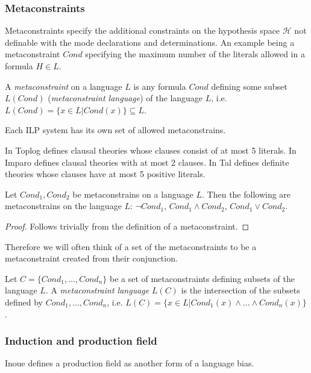 \subsubsection{Metaconstraints}
Metaconstraints specify the additional constraints on the hypothesis space $\mathcal{H}$ not definable with the mode declarations and determinations.
An example being a metaconstraint $Cond$ specifying the maximum number of the literals allowed in a formula $H \in L$.

\begin{defn}
A \emph{metaconstraint} on a language $L$ is any formula $Cond$ defining some subset $L(Cond)$ (\emph{metaconstraint language}) of the language $L$, i.e. $L(Cond)=\{x \in L | Cond(x)\}\subseteq L$.
\end{defn}

Each ILP system has its own set of allowed metaconstrains.
\begin{exmp}
In Toplog  defines clausal theories whose clauses consist of at most 5 literals.
In Imparo  defines clausal theories with at most 2 clauses.
In Tal  defines definite theories whose clauses have at most 5 positive literals.
\end{exmp}

\begin{proposition}
Let $Cond_1, Cond_2$ be metaconstrains on a language $L$.
Then the following are metaconstrains on the language $L$:
$\neg Cond_1$, $Cond_1 \land Cond_2$, $Cond_1 \lor Cond_2$.
\end{proposition}

\begin{proof}
Follows trivially from the definition of a metaconstraint.
\end{proof}

Therefore we will often think of a set of the metaconstraints to be a metaconstraint created from their conjunction.

\begin{defn}
Let $C=\{Cond_1, ..., Cond_n\}$ be a set of metaconstraints defining subsets of the language $L$.
A \emph{metaconstraint language} $L(C)$ is the intersection of the subsets defined by $Cond_1, ..., Cond_n$,
i.e. $L(C)=\{x \in L | Cond_1(x) \land ... \land Cond_n(x) \}$.
\end{defn}

\subsubsection{Induction and production field}
Inoue defines a production field as another form of a language bias.

